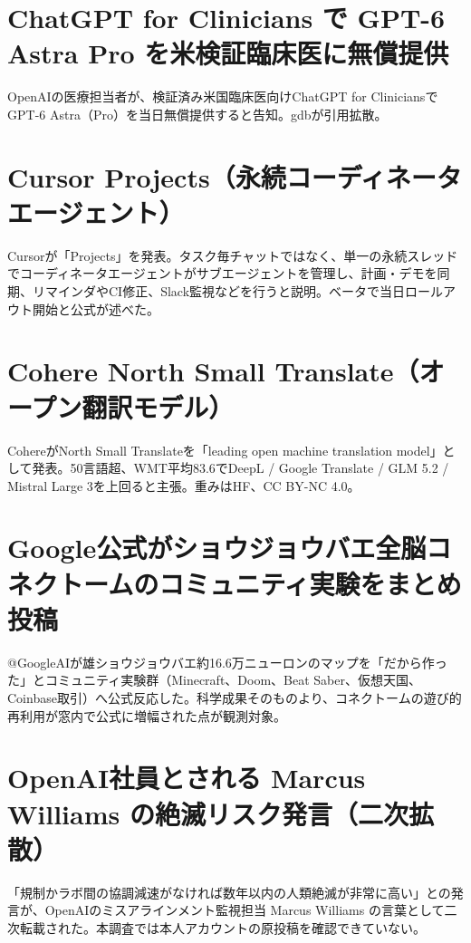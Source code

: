 \section{ChatGPT for Clinicians で GPT-6 Astra Pro を米検証臨床医に無償提供}
OpenAIの医療担当者が、検証済み米国臨床医向けChatGPT for CliniciansでGPT-6 Astra（Pro）を当日無償提供すると告知。gdbが引用拡散。

\section{Cursor Projects（永続コーディネータエージェント）}
Cursorが「Projects」を発表。タスク毎チャットではなく、単一の永続スレッドでコーディネータエージェントがサブエージェントを管理し、計画・デモを同期、リマインダやCI修正、Slack監視などを行うと説明。ベータで当日ロールアウト開始と公式が述べた。

\section{Cohere North Small Translate（オープン翻訳モデル）}
CohereがNorth Small Translateを「leading open machine translation model」として発表。50言語超、WMT平均83.6でDeepL / Google Translate / GLM 5.2 / Mistral Large 3を上回ると主張。重みはHF、CC BY-NC 4.0。

\section{Google公式がショウジョウバエ全脳コネクトームのコミュニティ実験をまとめ投稿}
@GoogleAIが雄ショウジョウバエ約16.6万ニューロンのマップを「だから作った」とコミュニティ実験群（Minecraft、Doom、Beat Saber、仮想天国、Coinbase取引）へ公式反応した。科学成果そのものより、コネクトームの遊び的再利用が窓内で公式に増幅された点が観測対象。

\section{OpenAI社員とされる Marcus Williams の絶滅リスク発言（二次拡散）}
「規制かラボ間の協調減速がなければ数年以内の人類絶滅が非常に高い」との発言が、OpenAIのミスアラインメント監視担当 Marcus Williams の言葉として二次転載された。本調査では本人アカウントの原投稿を確認できていない。

